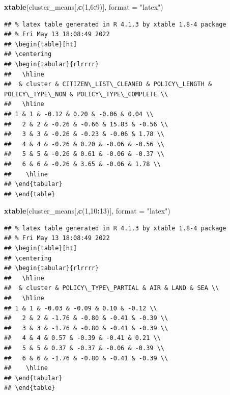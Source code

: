 \documentclass[]{article}
\newenvironment{Shaded}{\begin{snugshade}}{\end{snugshade}}
\newcommand{\DataTypeTok}[1]{\textcolor[rgb]{0.13,0.29,0.53}{#1}}
\newcommand{\DecValTok}[1]{\textcolor[rgb]{0.00,0.00,0.81}{#1}}
\newcommand{\KeywordTok}[1]{\textcolor[rgb]{0.13,0.29,0.53}{\textbf{#1}}}
\newcommand{\NormalTok}[1]{#1}
\newcommand{\OperatorTok}[1]{\textcolor[rgb]{0.81,0.36,0.00}{\textbf{#1}}}
\newcommand{\StringTok}[1]{\textcolor[rgb]{0.31,0.60,0.02}{#1}}
\begin{document}
\begin{Shaded}
\begin{Highlighting}[]
\KeywordTok{xtable}\NormalTok{(cluster_means[,}\KeywordTok{c}\NormalTok{(}\DecValTok{1}\NormalTok{,}\DecValTok{6}\OperatorTok{:}\DecValTok{9}\NormalTok{)], }\DataTypeTok{format =} \StringTok{"latex"}\NormalTok{)}
\end{Highlighting}
\end{Shaded}

\begin{verbatim}
## % latex table generated in R 4.1.3 by xtable 1.8-4 package
## % Fri May 13 18:08:49 2022
## \begin{table}[ht]
## \centering
## \begin{tabular}{rlrrrr}
##   \hline
##  & cluster & CITIZEN\_LIST\_CLEANED & POLICY\_LENGTH & POLICY\_TYPE\_NON & POLICY\_TYPE\_COMPLETE \\ 
##   \hline
## 1 & 1 & -0.12 & 0.20 & -0.06 & 0.04 \\ 
##   2 & 2 & -0.26 & -0.66 & 15.83 & -0.56 \\ 
##   3 & 3 & -0.26 & -0.23 & -0.06 & 1.78 \\ 
##   4 & 4 & -0.26 & 0.20 & -0.06 & -0.56 \\ 
##   5 & 5 & -0.26 & 0.61 & -0.06 & -0.37 \\ 
##   6 & 6 & -0.26 & 3.65 & -0.06 & 1.78 \\ 
##    \hline
## \end{tabular}
## \end{table}
\end{verbatim}

\begin{Shaded}
\begin{Highlighting}[]
\KeywordTok{xtable}\NormalTok{(cluster_means[,}\KeywordTok{c}\NormalTok{(}\DecValTok{1}\NormalTok{,}\DecValTok{10}\OperatorTok{:}\DecValTok{13}\NormalTok{)], }\DataTypeTok{format =} \StringTok{"latex"}\NormalTok{)}
\end{Highlighting}
\end{Shaded}

\begin{verbatim}
## % latex table generated in R 4.1.3 by xtable 1.8-4 package
## % Fri May 13 18:08:49 2022
## \begin{table}[ht]
## \centering
## \begin{tabular}{rlrrrr}
##   \hline
##  & cluster & POLICY\_TYPE\_PARTIAL & AIR & LAND & SEA \\ 
##   \hline
## 1 & 1 & -0.03 & -0.09 & 0.10 & -0.12 \\ 
##   2 & 2 & -1.76 & -0.80 & -0.41 & -0.39 \\ 
##   3 & 3 & -1.76 & -0.80 & -0.41 & -0.39 \\ 
##   4 & 4 & 0.57 & -0.39 & -0.41 & 0.21 \\ 
##   5 & 5 & 0.37 & -0.37 & -0.06 & -0.39 \\ 
##   6 & 6 & -1.76 & -0.80 & -0.41 & -0.39 \\ 
##    \hline
## \end{tabular}
## \end{table}
\end{verbatim}
\end{document}
